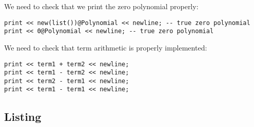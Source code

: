 We need to check that we print the zero polynomial properly:

\begin{small}
\begin{verbatim}
print << new(list())@Polynomial << newline; -- true zero polynomial
print << 0@Polynomial << newline; -- true zero polynomial
\end{verbatim}
\end{small}

We need to check that term arithmetic is properly implemented:

\begin{small}
\begin{verbatim}
print << term1 + term2 << newline;
print << term1 - term2 << newline;
print << term2 - term1 << newline;
print << term1 - term1 << newline;
\end{verbatim}
\end{small}

\subsection{Listing}

\label{OpsInPolynomialListing}


